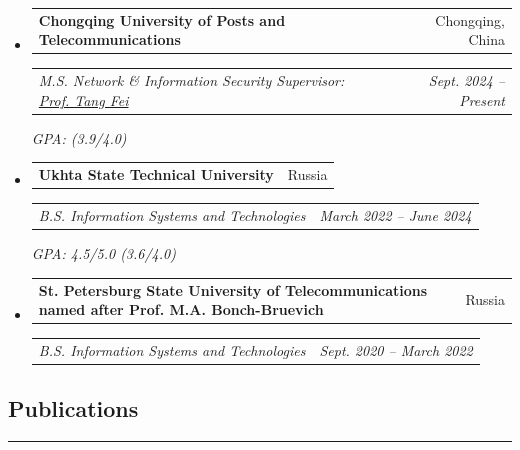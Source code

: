 \documentclass[11pt,letterpaper]{article}
\makeatletter
\newcommand{\headerrow}[2]
{\begin{tabular*}{\linewidth}{l@{\extracolsep{\fill}}r}
#1 & #2 \\
\end{tabular*}}
\makeatother
\begin{document}
\begin{itemize}[leftmargin=1em, itemsep=0.4em]
    \parskip=0.1em

    \item
    \headerrow
        {\textbf{Chongqing University of Posts and Telecommunications}}
        {Chongqing, China}
    \headerrow
        {\emph{M.S. Network \& Information Security \quad Supervisor: \href{https://faculty.cqupt.edu.cn/tangfei/en/index.htm}{Prof. Tang Fei}}}
        {\emph{Sept. 2024 -- Present}}
        {\emph{GPA: (3.9/4.0)}}

    \item
    \headerrow
        {\textbf{Ukhta State Technical University}}
        {Russia}
    \headerrow
        {\emph{B.S. Information Systems and Technologies}}
        {\emph{March 2022 -- June 2024}}
        {\emph{GPA: 4.5/5.0 (3.6/4.0)}}

    \item
    \headerrow
        {\textbf{St. Petersburg State University of Telecommunications named after Prof. M.A. Bonch-Bruevich}}
        {Russia}
    \headerrow
        {\emph{B.S. Information Systems and Technologies}}
        {\emph{Sept. 2020 -- March 2022}}

\end{itemize}

\vspace{0.2cm}

\subsection*{\Large Publications}
\vspace{-0.5em}
\hrule
\vspace{0.3em}
\end{document}
